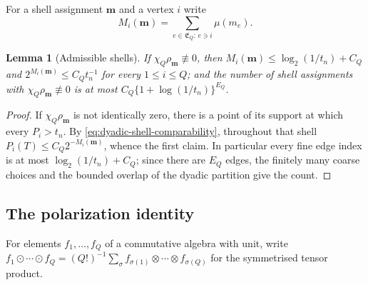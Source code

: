 \documentclass[11pt]{article}
\newtheorem{lemma}[lemma]{Lemma}
\newcommand{\od}{\mathbin{\odot}}
\begin{document}
For a shell assignment \(\bm m\) and a vertex \(i\) write
\begin{equation}
 M_i(\bm m)=\sum_{e\in\mathfrak E_Q:\,e\ni i}\mu(m_e).
 \label{eq:vertex-shell-sum}
\end{equation}

\begin{lemma}[Admissible shells]\label{lem:admissible-shells}
If \(\chi_Q\rho_{\bm m}\not\equiv0\), then \(M_i(\bm m)\le\log_2(1/t_n)+C_Q\)
and \(2^{M_i(\bm m)}\le C_Qt_n^{-1}\) for every \(1\le i\le Q\); and the number
of shell assignments with \(\chi_Q\rho_{\bm m}\not\equiv0\) is at most
\(C_Q\{1+\log(1/t_n)\}^{E_Q}\).
\end{lemma}
\begin{proof}
If \(\chi_Q\rho_{\bm m}\) is not identically zero, there is a point of its
support at which every \(P_i>t_n\).  By
\eqref{eq:dyadic-shell-comparability}, throughout that shell
\(P_i(T)\le C_Q2^{-M_i(\bm m)}\), whence the first claim.  In particular
every fine edge index is at most \(\log_2(1/t_n)+C_Q\); since there are
\(E_Q\) edges, the finitely many coarse choices and the bounded overlap
of the dyadic partition give the count.
\end{proof}

\subsection{The polarization identity}
For elements \(f_1,\dots,f_Q\) of a commutative algebra with unit, write
\(f_1\od\cdots\od f_Q=(Q!)^{-1}\sum_{\sigma}f_{\sigma(1)}\otimes\cdots\otimes f_{\sigma(Q)}\)
for the symmetrised tensor product.
\end{document}

